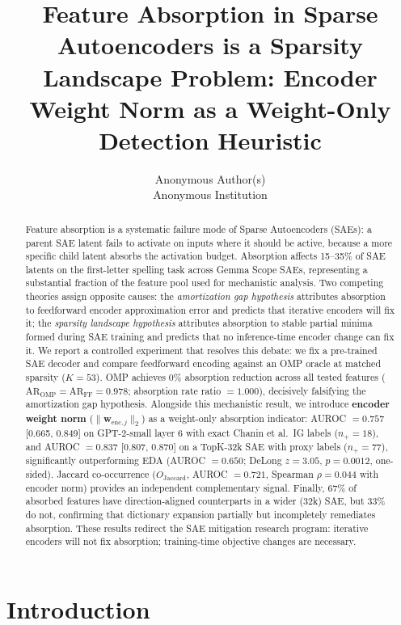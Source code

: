 \documentclass{article}
\title{Feature Absorption in Sparse Autoencoders is a Sparsity Landscape Problem:
Encoder Weight Norm as a Weight-Only Detection Heuristic}
\author{
  Anonymous Author(s)\\
  Anonymous Institution
}
\begin{document}
\maketitle

\begin{abstract}
Feature absorption is a systematic failure mode of Sparse Autoencoders (SAEs): a parent SAE
latent fails to activate on inputs where it should be active, because a more specific child
latent absorbs the activation budget. Absorption affects 15--35\% of SAE latents on the
first-letter spelling task across Gemma Scope SAEs, representing a substantial fraction of
the feature pool used for mechanistic analysis. Two competing theories assign opposite causes:
the \emph{amortization gap hypothesis} \citep{oneill2024amortization} attributes absorption to
feedforward encoder approximation error and predicts that iterative encoders will fix it; the
\emph{sparsity landscape hypothesis} \citep{tang2024unified} attributes absorption to stable
partial minima formed during SAE training and predicts that no inference-time encoder change
can fix it. We report a controlled experiment that resolves this debate: we fix a pre-trained
SAE decoder and compare feedforward encoding against an OMP oracle at matched sparsity
($K=53$). OMP achieves 0\% absorption reduction across all tested features
($\mathrm{AR}_\mathrm{OMP} = \mathrm{AR}_\mathrm{FF} = 0.978$; absorption rate ratio $= 1.000$),
decisively falsifying the amortization gap hypothesis. Alongside this mechanistic result, we
introduce \textbf{encoder weight norm} ($\|\mathbf{w}_{\mathrm{enc},j}\|_2$) as a weight-only
absorption indicator: AUROC $= 0.757$ [0.665, 0.849] on GPT-2-small layer 6 with exact
Chanin et al.\ IG labels ($n_+ = 18$), and AUROC $= 0.837$ [0.807, 0.870] on a TopK-32k SAE
with proxy labels ($n_+ = 77$), significantly outperforming EDA (AUROC $= 0.650$;
DeLong $z = 3.05$, $p = 0.0012$, one-sided). Jaccard co-occurrence ($O_\mathrm{Jaccard}$,
AUROC $= 0.721$, Spearman $\rho = 0.044$ with encoder norm) provides an independent
complementary signal. Finally, 67\% of absorbed features have direction-aligned counterparts
in a wider (32k) SAE, but 33\% do not, confirming that dictionary expansion partially but
incompletely remediates absorption. These results redirect the SAE mitigation research program:
iterative encoders will not fix absorption; training-time objective changes are necessary.
\end{abstract}

\section{Introduction}
\end{document}
